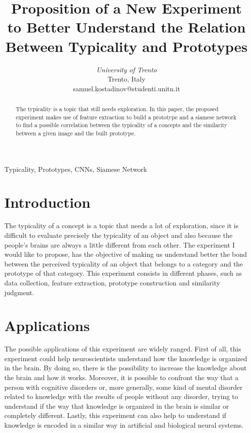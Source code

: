 \documentclass[conference]{IEEEtran}
\begin{document}
	\title{Proposition of a New Experiment to Better Understand the Relation Between Typicality and Prototypes}


	\author{
	\textit{University of Trento}\\
	Trento, Italy \\
	samuel.kostadinov@studenti.unitn.it}


	\maketitle


	\begin{abstract}
		
		The typicality is a topic that still needs exploration. In this paper, the proposed experiment makes use of feature extraction to build a prototype and a siamese network to find a possible correlation 
		between the typicality of a concepts and the similarity between a given image and the built prototype. 
		
	\end{abstract}

	\begin{IEEEkeywords}
		Typicality, Prototypes, CNNs, Siamese Network
	\end{IEEEkeywords}


	\section{Introduction}
		
		\noindent The typicality of a concept is a topic that needs a lot of exploration, since it is difficult to evaluate precisely the typicality of an object 
		and also because the people's brains are always a little different from each other. The experiment I would like to propose, has the objective of 
		making us understand better the bond between the perceived typicality of an object that belongs to a category and the prototype of that category.
		This experiment consists in different phases, such as data collection, feature extraction, prototype construction and similarity judgment.
		
	\section{Applications}
	
		\noindent The possible applications of this experiment are widely ranged. First of all, this experiment could help neuroscientists understand how the knowledge is 
		organized in the brain. By doing so, there is the possibility to increase the knowledge about the brain and how it works. Moreover, it is possible to confront 
		the way that a person with cognitive disorders or, more generally, some kind of mental disorder related to knowledge with the results of people without 
		any disorder, trying to understand if the way that knowledge is organized in the brain is similar or completely different. Lastly, this experiment can 
		also help to understand if knowledge is encoded in a similar way in artificial and biological neural systems. 
\end{document}

